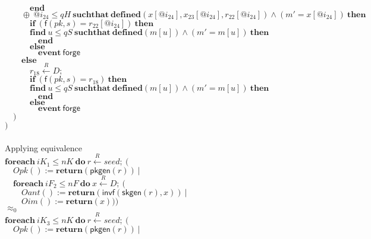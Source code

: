 \documentclass{article}
\newcommand{\store}{\leftarrow}
\newcommand{\getR}{\stackrel{R}{\store}}
\newcommand{\kw}[1]{\mathbf{#1}}
\newcommand{\kwf}[1]{\mathsf{#1}}
\newcommand{\var}[1]{\mathit{#1}}
\newcommand{\kwt}[1]{\mathit{#1}}
\newcommand{\kwp}[1]{\mathit{#1}}
\begin{document}
\begin{tabbing}
$\quad \quad \quad \kw{end}$\\
$\quad \quad \oplus\ \var{@i}_{24} \leq \kwp{qH}\ \kw{suchthat}\ \kw{defined}(\var{x}[\var{@i}_{24}], \var{x}_{23}[\var{@i}_{24}], \var{r}_{22}[\var{@i}_{24}])\wedge (\var{m'}  =  \var{x}[\var{@i}_{24}])\ \kw{then}$\\
$\quad \quad \quad \kw{if}\ (\kwf{f}(\var{pk}, \var{s})  =  \var{r}_{22}[\var{@i}_{24}])\ \kw{then}$\\
$\quad \quad \quad \kw{find}\ \var{u} \leq \kwp{qS}\ \kw{suchthat}\ \kw{defined}(\var{m}[\var{u}])\wedge (\var{m'}  =  \var{m}[\var{u}])\ \kw{then}$\\
$\quad \quad \quad \quad \kw{end}$\\
$\quad \quad \quad \kw{else}$\\
$\quad \quad \quad \quad \kw{event}\ \kwf{forge}$\\
$\quad \quad \kw{else}$\\
$\quad \quad \quad \var{r}_{18} \getR \kwt{D};$\\
$\quad \quad \quad \kw{if}\ (\kwf{f}(\var{pk}, \var{s})  =  \var{r}_{18})\ \kw{then}$\\
$\quad \quad \quad \kw{find}\ \var{u} \leq \kwp{qS}\ \kw{suchthat}\ \kw{defined}(\var{m}[\var{u}])\wedge (\var{m'}  =  \var{m}[\var{u}])\ \kw{then}$\\
$\quad \quad \quad \quad \kw{end}$\\
$\quad \quad \quad \kw{else}$\\
$\quad \quad \quad \quad \kw{event}\ \kwf{forge}$\\
$\quad )$\\
$)$\\
$ $\\
\\
Applying equivalence\\
$\kw{foreach}\ \var{iK}_{1} \leq \kwp{nK}\ \kw{do}\ \var{r} \getR seed;\ ($\\
$\quad  Opk() := \kw{return}(\kwf{pkgen}(\var{r}))\ |$\\
$\quad  \kw{foreach}\ \var{iF}_{2} \leq \kwp{nF}\ \kw{do}\ \var{x} \getR D;\ ($\\
$\quad  \quad Oant() := \kw{return}(\kwf{invf}(\kwf{skgen}(\var{r}), \var{x}))\ |$\\
$\quad  \quad Oim() := \kw{return}(\var{x})))$\\
$\approx_{0}$\\
$\kw{foreach}\ \var{iK}_{3} \leq \kwp{nK}\ \kw{do}\ \var{r} \getR seed;\ ($\\
$\quad  Opk() := \kw{return}(\kwf{pkgen}(\var{r}))\ |$\\

\end{tabbing}
\end{document}
